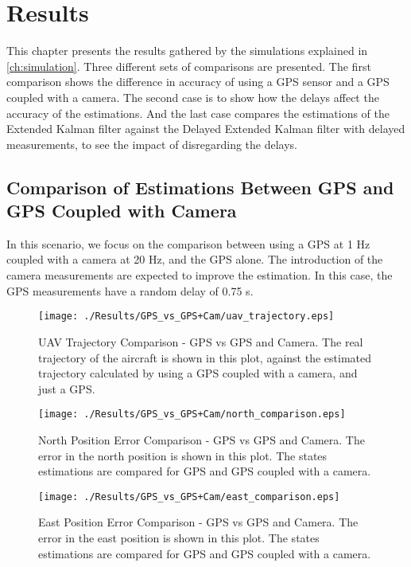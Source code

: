 \chapter{Results}
\label{ch:results}

This chapter presents the results gathered by the simulations explained in \ref{ch:simulation}. Three different sets of comparisons are presented. The first comparison shows the difference in accuracy of using a GPS sensor and a GPS coupled with a camera. The second case is to show how the delays affect the accuracy of the estimations. And the last case compares the estimations of the Extended Kalman filter against the Delayed Extended Kalman filter with delayed measurements, to see the impact of disregarding the delays.
\pagebreak
\section{Comparison of Estimations Between GPS and GPS Coupled with Camera}
In this scenario, we focus on the comparison between using a GPS at 1 Hz coupled with a camera at 20 Hz, and the GPS alone. The introduction of the camera measurements are expected to improve the estimation. In this case, the GPS measurements have a random delay of 0.75 s.
\begin{figure}[H]
  \centering
  \texttt{[image: ./Results/GPS\_vs\_GPS+Cam/uav\_trajectory.eps]}
  \caption[UAV Trajectory Comparison - GPS vs GPS and Camera]{UAV Trajectory Comparison - GPS vs GPS and Camera. The real trajectory of the aircraft is shown in this plot, against the estimated trajectory calculated by using a GPS coupled with a camera, and just a GPS.}
\end{figure}

\begin{figure}[H]
  \centering
  \texttt{[image: ./Results/GPS\_vs\_GPS+Cam/north\_comparison.eps]}
  \caption[North Position Error Comparison - GPS vs GPS and Camera]{North Position Error Comparison - GPS vs GPS and Camera. The error in the north position is shown in this plot. The states estimations are compared for GPS and GPS coupled with a camera.}
\end{figure}

\begin{figure}[H]
  \centering
  \texttt{[image: ./Results/GPS\_vs\_GPS+Cam/east\_comparison.eps]}
  \caption[East Position Error Comparison - GPS vs GPS and Camera]{East Position Error Comparison - GPS vs GPS and Camera. The error in the east position is shown in this plot. The states estimations are compared for GPS and GPS coupled with a camera.}
\end{figure}

